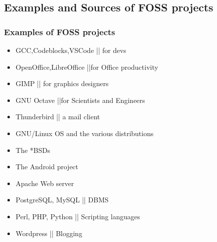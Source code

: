 \documentclass{beamer}
\begin{document}
	\subsection{Examples and Sources of FOSS projects }
	\begin{frame}
		\frametitle{Examples of FOSS projects}
		\begin{itemize}
			\item GCC,Codeblocks,VSCode || for devs
			\item OpenOffice,LibreOffice ||for Office productivity
			\item GIMP || for graphics designers
			\item GNU Octave ||for Scientists and Engineers
			\item Thunderbird || a mail client
			\item GNU/Linux OS and the various distributions
			\item The *BSDs
			\item The Android project
			\item Apache Web server
			\item PostgreSQL, MySQL || DBMS
			\item Perl, PHP, Python || Scripting languages
			\item Wordpress || Blogging
		\end{itemize}
	\end{frame}
\end{document}
